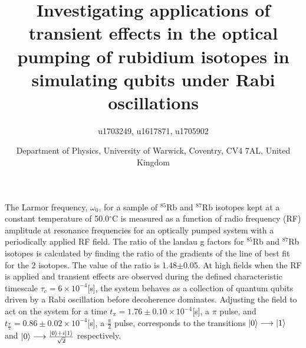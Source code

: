 \documentclass{article}
\DeclarePairedDelimiter\ket{\lvert}{\rangle}
\begin{document}
\title{Investigating applications of transient effects in the optical pumping of rubidium isotopes in simulating qubits under Rabi oscillations }
\author{u1703249, u1617871, u1705902}
\date{Department of Physics, University of Warwick, Coventry, CV4 7AL, United Kingdom}

\maketitle
The Larmor frequency, $\omega_0$, for a sample of $^{85}$Rb and $^{87}$Rb isotopes kept at a constant temperature of 50.0$^{\circ}$C is measured as a function of radio frequency (RF) amplitude at resonance frequencies for an optically pumped system with a periodically applied RF field. The ratio of the landau g factors for $^{85}$Rb and $^{87}$Rb isotopes is calculated by finding the ratio of the gradients of the line of best fit for the 2 isotopes. The value of the ratio is 1.48$\pm$0.05. At high fields when the RF is applied and transient effects are observed during the defined characteristic timescale $\tau_c=6\times10^{-4}$[s], the system behaves as a collection of quantum qubits driven by a Rabi oscillation before decoherence dominates. Adjusting the field to act on the system for a time $t_{\pi}=1.76\pm0.10\times10^{-4}$[s], a $\pi$ pulse, and $t_{\frac{\pi}{2}}=0.86\pm0.02\times10^{-4}$[s], a $\frac{\pi}{2}$ pulse, corresponds to the transitions $\ket{0}\longrightarrow\ket{1}$ and
$\ket{0} \longrightarrow\frac{\ket{0}+i\ket{1}}{\sqrt{2}}$ respectively.

\end{document}
